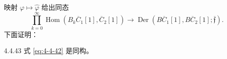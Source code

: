 映射 $\varphi\mapsto\widehat\varphi$ 给出同态
\begin{equation}
 \prod_{k=0}^{\infty}
 \operatorname{Hom}(B_k\overline C_1[1],\overline C_2[1])
 \longrightarrow
 \operatorname{Der}(B\overline C_1[1],B\overline C_2[1];
 \overline{\mathfrak f}).
\tag{4.4.42}\label{eq:4-4-42}
\end{equation}
下面证明：

\begin{lemma}{4.4.43}\label{lem:4-4-43}
式 \eqref{eq:4-4-42} 是同构。
\end{lemma}

